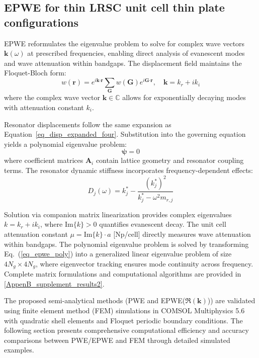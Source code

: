 \documentclass[review,numbers,sort&compress]{elsarticle}
\begin{document}
\subsection{EPWE for thin LRSC unit cell thin plate configurations}\label{epwe}

EPWE reformulates the eigenvalue problem to solve for complex wave vectors $\mathbf{k}(\omega)$ at prescribed frequencies, enabling direct analysis of evanescent modes and wave attenuation within bandgaps. The displacement field maintains the Floquet-Bloch form:
\begin{equation}
w(\mathbf{r}) = e^{i\mathbf{k}\pmb{\cdot}\mathbf{r}}\sum_{\mathbf{G}}w(\mathbf{G})e^{i\mathbf{G}\pmb{\cdot}\mathbf{r}}, \quad \mathbf{k} = k_r + ik_i
\label{eq_epwe_bloch}
\end{equation}
where the complex wave vector $\mathbf{k} \in \mathbb{C}$ allows for exponentially decaying modes with attenuation constant $k_i$.

Resonator displacements follow the same expansion as Equation~\eqref{eq_disp_expanded_four}. Substitution into the governing equation yields a polynomial eigenvalue problem:
\begin{equation}
[\mathbf{A}_3 k^3 + \mathbf{A}_2 k^2 + \mathbf{A}_1 k + \mathbf{A}_0]\boldsymbol{\psi} = 0
\label{eq_epwe_poly}
\end{equation}
where coefficient matrices $\mathbf{A}_i$ contain lattice geometry and resonator coupling terms. The resonator dynamic stiffness incorporates frequency-dependent effects:
\begin{equation}
D_j(\omega) = k_j^* - \frac{(k_j^*)^2}{k_j^* - \omega^2 m_{r,j}}
\label{eq_epwe_dynamic_stiffness}
\end{equation}

Solution via companion matrix linearization provides complex eigenvalues $k = k_r + ik_i$, where $\text{Im}\{k\} > 0$ quantifies evanescent decay. The unit cell attenuation constant $\mu = \text{Im}\{k\} \cdot a$ [Np/cell] directly measures wave attenuation within bandgaps. The polynomial eigenvalue problem is solved by transforming Eq.~(\ref{eq_epwe_poly}) into a generalized linear eigenvalue problem of size $4N_g \times 4N_g$, where eigenvector tracking ensures mode continuity across frequency. Complete matrix formulations and computational algorithms are provided in \ref{AppenB_supplement_results2}.

The proposed semi-analytical methods (PWE and EPWE($\Re(\mathbf{k})$)) are validated using finite element method (FEM) simulations in COMSOL Multiphysics 5.6 with quadratic shell elements and Floquet periodic boundary conditions. The following section presents comprehensive computational efficiency and accuracy comparisons between PWE/EPWE and FEM through detailed simulated examples.
\end{document}
